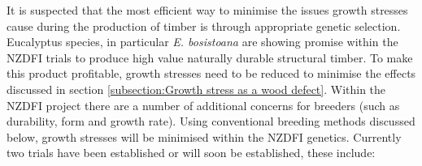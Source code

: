 It is suspected that the most efficient way to minimise the issues growth
stresses cause during the production of timber is through appropriate genetic
selection. Eucalyptus species, in particular \textit{E. bosistoana} are showing
promise within the NZDFI trials to produce high value naturally durable
structural timber. To make this
product profitable, growth stresses need to be reduced to minimise the effects
discussed in section \ref{subsection:Growth stress as a wood defect}. Within the NZDFI project there are a number of
additional concerns for breeders (such as durability, form and growth rate). Using conventional breeding methods
discussed below, growth stresses will be minimised within the NZDFI genetics.
Currently two trials have been established or will soon be established, these
include: